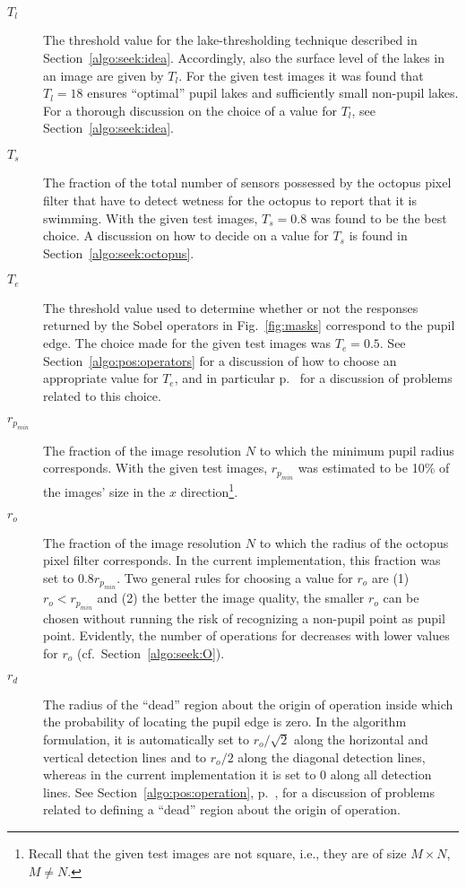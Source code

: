 \begin{description}
\item[$T_{l}$] The threshold value for the lake-thresholding technique
  described in Section~\ref{algo:seek:idea}.  Accordingly, also the
  surface level of the lakes in an image are given by $T_{l}$.  For
  the given test images it was found that $T_{l}=18$ ensures
  ``optimal'' pupil lakes and sufficiently small non-pupil lakes.  For
  a thorough discussion on the choice of a value for $T_{l}$, see
  Section~\ref{algo:seek:idea}.
\item[$T_{s}$] The fraction of the total number of sensors possessed
  by the octopus pixel filter that have to detect wetness for the
  octopus to report that it is swimming.  With the given test images,
  $T_{s}=0.8$ was found to be the best choice.  A discussion on how to
  decide on a value for $T_{s}$ is found in
  Section~\ref{algo:seek:octopus}.
\item[$T_{e}$] The threshold value used to determine whether or not
  the responses returned by the Sobel operators in
  Fig.~\ref{fig:masks} correspond to the pupil edge.  The choice made
  for the given test images was $T_{e}=0.5$.  See
  Section~\ref{algo:pos:operators} for a discussion of how to choose
  an appropriate value for $T_{e}$, and in particular
  p.~\pageref{pg:TEproblems} for a discussion of problems related to
  this choice.
\item[$r_{p_{min}}$] The fraction of the image resolution $N$ to which
  the minimum pupil radius corresponds.  With the given test images,
  $r_{p_{min}}$ was estimated to be 10\% of the images' size in the
  $x$ direction\footnote{Recall that the given test images are not
    square, i.e., they are of size $M\times N$, $M\neq N$.}.
\item[$r_{o}$] The fraction of the image resolution $N$ to which the
  radius of the octopus pixel filter corresponds.  In the current
  implementation, this fraction was set to $0.8r_{p_{min}}$.  Two
  general rules for choosing a value for $r_{o}$ are (1)
  $r_{o}<r_{p_{min}}$ and (2) the better the image quality, the
  smaller $r_{o}$ can be chosen without running the risk of
  recognizing a non-pupil point as pupil point.  Evidently, the number
  of operations for {\octopus} decreases with lower values for $r_{o}$
  (cf.\ Section~\ref{algo:seek:O}).
\item[$r_{d}$] The radius of the ``dead'' region about the origin of
  operation inside which the probability of locating the pupil edge is
  zero.  In the algorithm formulation, it is automatically set to
  $r_{o}/\sqrt{2}$ along the horizontal and vertical detection lines
  and to $r_{o}/2$ along the diagonal detection lines, whereas in the
  current implementation it is set to 0 along all detection lines.
  See Section~\ref{algo:pos:operation}, p.~\pageref{pg:dead}, for a
  discussion of problems related to defining a ``dead'' region about
  the origin of operation.
\end{description}

